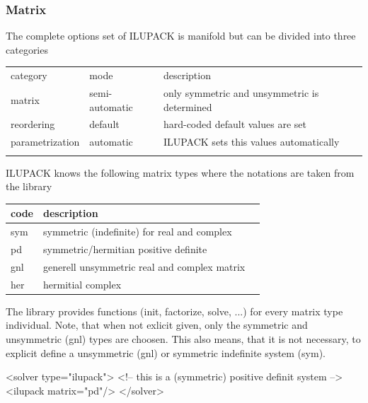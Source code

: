 \subsubsection*{Matrix}
The complete options set of ILUPACK is manifold but can be divided into three
categories
\begin{center}
\begin{tabular}{llp{}}
\toprule
category & mode & description \\
\noalign{\smallskip}\hline\noalign{\smallskip}
matrix & semi-automatic & only symmetric and unsymmetric is determined\\
reordering & default & hard-coded default values are set\\
parametrization & automatic & ILUPACK sets this values automatically\\
\noalign{\smallskip}\hline
\end{tabular}
\end{center}

ILUPACK knows the following matrix types where the notations are taken from the
library
\begin{center}
\begin{tabular}{llp{}}
\toprule
code & description \\
\midrule
sym & symmetric (indefinite) for real and complex \\
pd & symmetric/hermitian positive definite \\
gnl & generell unsymmetric real and complex matrix \\
her & hermitial complex \\
\bottomrule
\end{tabular}
\end{center}
The library provides functions (init, factorize, solve, ...) for every matrix
type individual. Note, that when not exlicit given, only the symmetric and
unsymmetric (gnl) types are choosen. This also means, that it is not necessary,
to explicit define a unsymmetric (gnl) or symmetric indefinite system (sym).
\begin{xmllisting}
<solver type="ilupack">
  <!-- this is a (symmetric) positive definit system -->
  <ilupack matrix="pd"/>
</solver>
\end{xmllisting}

